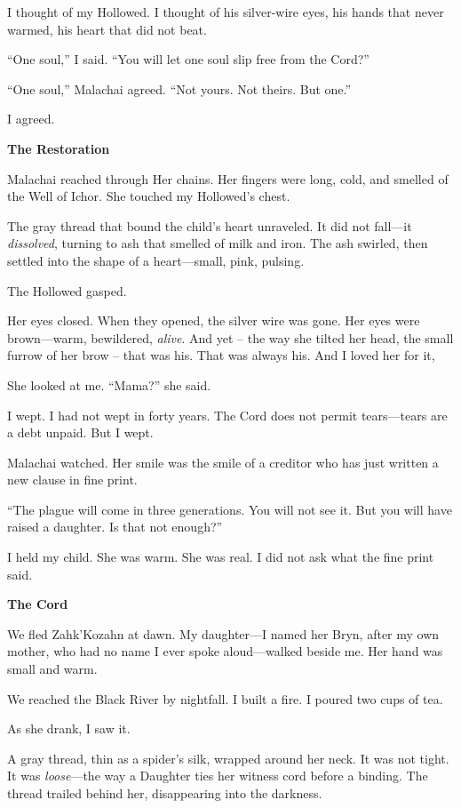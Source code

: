 \documentclass[11pt]{article}
\newenvironment{founddocument}{%
  \begin{mdframed}[backgroundcolor=horrorbg, linecolor=bloodcolor, linewidth=1pt, leftmargin=0.5cm, rightmargin=0.5cm]
  \setlength{\parskip}{0.8em}
}{%
  \end{mdframed}
}
\begin{document}
\begin{founddocument}
I thought of my Hollowed. I thought of his silver-wire eyes, his hands that never warmed, his heart that did not beat.

``One soul,'' I said. ``You will let one soul slip free from the Cord?''

``One soul,'' Malachai agreed. ``Not yours. Not theirs. But one.''

I agreed.

\vspace{1em}
\noindent
\textbf{The Restoration}

Malachai reached through Her chains. Her fingers were long, cold, and smelled of the Well of Ichor. She touched my Hollowed's chest.

The gray thread that bound the child's heart unraveled. It did not fall---it \emph{dissolved}, turning to ash that smelled of milk and iron. The ash swirled, then settled into the shape of a heart---small, pink, pulsing.

The Hollowed gasped.

Her eyes closed. When they opened, the silver wire was gone. Her eyes were brown---warm, bewildered, \emph{alive}. And yet -- the way she tilted her head, the small furrow of her brow -- that was his. That was always his. And I loved her for it,

She looked at me. ``Mama?'' she said.

I wept. I had not wept in forty years. The Cord does not permit tears---tears are a debt unpaid. But I wept.

Malachai watched. Her smile was the smile of a creditor who has just written a new clause in fine print.

``The plague will come in three generations. You will not see it. But you will have raised a daughter. Is that not enough?''

I held my child. She was warm. She was real. I did not ask what the fine print said.

\vspace{1em}
\noindent
\textbf{The Cord}

We fled Zahk'Kozahn at dawn. My daughter---I named her Bryn, after my own mother, who had no name I ever spoke aloud---walked beside me. Her hand was small and warm.

We reached the Black River by nightfall. I built a fire. I poured two cups of tea.

As she drank, I saw it.

A gray thread, thin as a spider's silk, wrapped around her neck. It was not tight. It was \emph{loose}---the way a Daughter ties her witness cord before a binding. The thread trailed behind her, disappearing into the darkness.


\end{founddocument}
\end{document}
